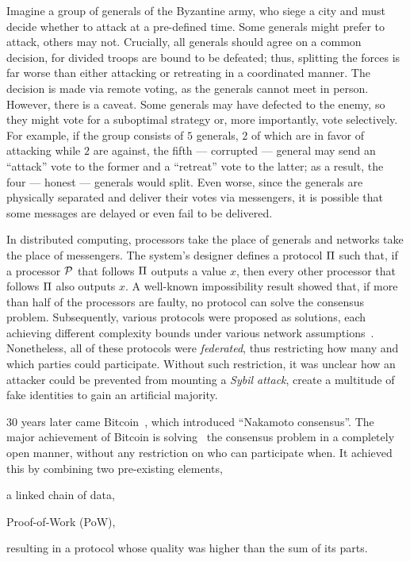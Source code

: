 Imagine a group of generals of the Byzantine army, who siege a city and must
decide whether to attack at a pre-defined time. Some generals might prefer to
attack, others may not. Crucially, all generals should agree on a common
decision, for divided troops are bound to be defeated; thus, splitting the
forces is far worse than either attacking or retreating in a coordinated
manner. The decision is made via remote voting, as the generals cannot meet in
person. However, there is a caveat. Some generals may have defected to the
enemy, so they might vote for a suboptimal strategy or, more importantly,
vote selectively. For example, if the group consists of $5$ generals, $2$
of which are in favor of attacking while $2$ are against, the fifth ---
corrupted --- general may send an ``attack'' vote to the former and a
``retreat'' vote to the latter; as a result, the four --- honest --- generals
would split. Even worse, since the generals are physically separated and
deliver their votes via messengers, it is possible that some messages are
delayed or even fail to be delivered.

In distributed computing, processors take the place of generals and networks
take the place of messengers. The system's designer defines a protocol $\Pi$
such that, if a processor $\mathcal{P}$ that follows $\Pi$ outputs a value $x$,
then every other processor that follows $\Pi$ also outputs $x$. A well-known
impossibility result showed that, if more than half of the processors are faulty,
no protocol can solve the consensus problem. Subsequently, various protocols
were proposed as solutions, each achieving different complexity bounds under
various network assumptions~\cite{RSA:GarKia20}. Nonetheless, all of these
protocols were \emph{federated}, thus restricting how many and which parties
could participate. Without such restriction, it was unclear how an attacker
could be prevented from mounting a \emph{Sybil attack}, \ie create a
multitude of fake identities to gain an artificial majority.

$30$ years later came Bitcoin~\cite{nakamoto2008bitcoin}, which introduced
``Nakamoto consensus''. The major achievement of Bitcoin is
solving~\cite{EC:GarKiaLeo15} the consensus problem in a completely open
manner, \ie without any restriction on who can participate when. It achieved
this by combining two pre-existing elements,
\begin{inparaenum}[(a)]
    \item a linked chain of data,
    \item Proof-of-Work (PoW),
\end{inparaenum}
resulting in a protocol whose quality was higher than the sum of its parts.

